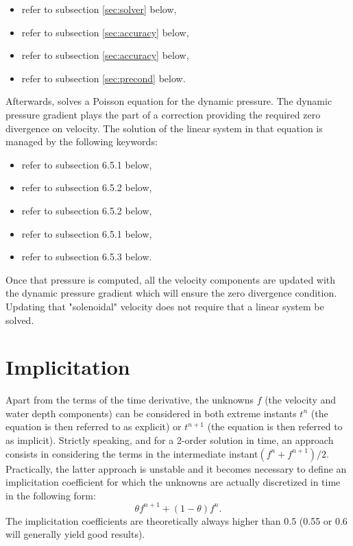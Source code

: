 \begin{itemize}
\item {} refer to subsection \ref{sec:solver} below,

\item {} refer to
subsection \ref{sec:accuracy} below,

\item {} refer to subsection \ref{sec:accuracy} below,

\item {} refer to subsection \ref{sec:precond}
below.
\end{itemize}

Afterwards,  solves a Poisson equation for the dynamic pressure. The
dynamic pressure gradient plays the part of a correction providing the required
zero divergence on velocity. The solution of the linear system in that equation
is managed by the following keywords:

\begin{itemize}
\item {} refer to subsection 6.5.1 below,

\item {} refer to subsection 6.5.2
below,

\item {} refer to subsection 6.5.2 below,

\item {} refer to subsection 6.5.1 below,

\item {} refer to subsection 6.5.3 below.
\end{itemize}

Once that pressure is computed, all the velocity components are updated with
the dynamic pressure gradient which will ensure the zero divergence condition.
Updating that "solenoidal" velocity does not require that a linear system be
solved.

\section{Implicitation}

Apart from the terms of the time derivative, the unknowns $f$ (the velocity and
water depth components) can be considered in both extreme instants $t^{n}$ (the
equation is then referred to as explicit) or $t^{n+1}$ (the equation is then
referred to as implicit). Strictly speaking, and for a 2-order solution in
time, an approach consists in considering the terms in the intermediate
instant$(f^{n} +f^{n+1} )/2$. Practically, the latter approach is unstable and
it becomes necessary to define an implicitation coefficient for which the
unknowns are actually discretized in time in the following form:
\[\theta f^{n+1} +(1-\theta )f^{n} .\]
The implicitation coefficients are theoretically always higher than 0.5 (0.55
or 0.6 will generally yield good results).

